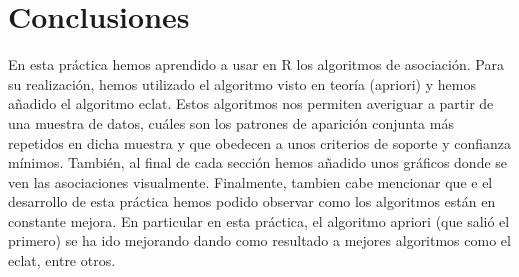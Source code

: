 \documentclass [a4paper] {article}
\begin{document}
\section{Conclusiones}

En esta práctica hemos aprendido a usar en R los algoritmos de asociación. Para su
realización, hemos utilizado el algoritmo visto en teoría (apriori) y hemos añadido
el algoritmo eclat. Estos algoritmos nos permiten averiguar a partir de una muestra
de datos, cuáles son los patrones de aparición conjunta más repetidos
en dicha muestra y que obedecen a unos criterios de soporte y confianza mínimos.
También, al final de cada sección hemos añadido unos gráficos donde se ven las
asociaciones visualmente. Finalmente, tambien cabe mencionar que e  el desarrollo de
esta práctica hemos podido observar como los algoritmos están en constante mejora.
En particular en esta práctica, el algoritmo apriori (que salió el primero) se ha ido
mejorando dando como resultado a mejores algoritmos como el eclat, entre otros.
\end{document}
